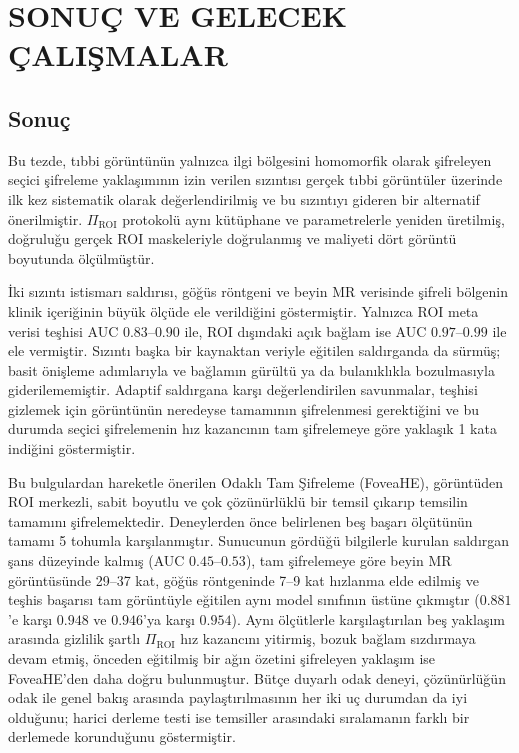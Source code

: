 \chapter{SONUÇ VE GELECEK ÇALIŞMALAR}\label{CH6}

\section{Sonuç}\label{sec:sonuc}

Bu tezde, tıbbi görüntünün yalnızca ilgi bölgesini homomorfik olarak şifreleyen seçici şifreleme yaklaşımının izin verilen sızıntısı gerçek tıbbi görüntüler üzerinde ilk kez sistematik olarak değerlendirilmiş ve bu sızıntıyı gideren bir alternatif önerilmiştir. $\Pi_{\mathrm{ROI}}$ protokolü aynı kütüphane ve parametrelerle yeniden üretilmiş, doğruluğu gerçek ROI maskeleriyle doğrulanmış ve maliyeti dört görüntü boyutunda ölçülmüştür.

İki sızıntı istismarı saldırısı, göğüs röntgeni ve beyin MR verisinde şifreli bölgenin klinik içeriğinin büyük ölçüde ele verildiğini göstermiştir. Yalnızca ROI meta verisi teşhisi AUC $0.83$--$0.90$ ile, ROI dışındaki açık bağlam ise AUC $0.97$--$0.99$ ile ele vermiştir. Sızıntı başka bir kaynaktan veriyle eğitilen saldırganda da sürmüş; basit önişleme adımlarıyla ve bağlamın gürültü ya da bulanıklıkla bozulmasıyla giderilememiştir. Adaptif saldırgana karşı değerlendirilen savunmalar, teşhisi gizlemek için görüntünün neredeyse tamamının şifrelenmesi gerektiğini ve bu durumda seçici şifrelemenin hız kazancının tam şifrelemeye göre yaklaşık 1 kata indiğini göstermiştir.

Bu bulgulardan hareketle önerilen Odaklı Tam Şifreleme (FoveaHE), görüntüden ROI merkezli, sabit boyutlu ve çok çözünürlüklü bir temsil çıkarıp temsilin tamamını şifrelemektedir. Deneylerden önce belirlenen beş başarı ölçütünün tamamı 5 tohumla karşılanmıştır. Sunucunun gördüğü bilgilerle kurulan saldırgan şans düzeyinde kalmış (AUC $0.45$--$0.53$), tam şifrelemeye göre beyin MR görüntüsünde 29--37 kat, göğüs röntgeninde 7--9 kat hızlanma elde edilmiş ve teşhis başarısı tam görüntüyle eğitilen aynı model sınıfının üstüne çıkmıştır ($0.881$'e karşı $0.948$ ve $0.946$'ya karşı $0.954$). Aynı ölçütlerle karşılaştırılan beş yaklaşım arasında gizlilik şartlı $\Pi_{\mathrm{ROI}}$ hız kazancını yitirmiş, bozuk bağlam sızdırmaya devam etmiş, önceden eğitilmiş bir ağın özetini şifreleyen yaklaşım ise FoveaHE'den daha doğru bulunmuştur. Bütçe duyarlı odak deneyi, çözünürlüğün odak ile genel bakış arasında paylaştırılmasının her iki uç durumdan da iyi olduğunu; harici derleme testi ise temsiller arasındaki sıralamanın farklı bir derlemede korunduğunu göstermiştir.

